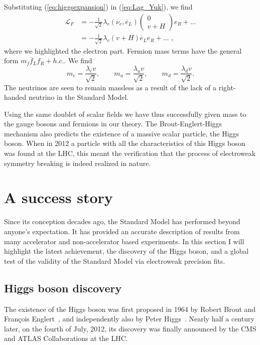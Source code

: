 Substituting (\ref{eq:higgsexpansion}) in (\ref{eq:Lag_Yuk}), we find 
\begin{align}
  \mathcal{L}_F &= - \frac{1}{\sqrt{2}} \lambda_e (\overline{\nu}_e, \overline{e}_L) 
		  \begin{pmatrix}0 \\ v+H \end{pmatrix} e_R + ... \\
                &= - \frac{1}{\sqrt{2}} \lambda_e (v+H) \overline{e}_L e_R + ... \textrm{ ,}
  \label{eq:yukawa}
\end{align}
where we highlighted the electron part. 
Fermion mass terms have the general form $m_f \overline{f}_L f_R + h.c.$. We find
\begin{equation}
m_e = \frac{\lambda_e v}{\sqrt{2}}, \qquad m_u = \frac{\lambda_u v}{\sqrt{2}}, \qquad m_d =
\frac{\lambda_d v}{\sqrt{2}}. \label{eq:fermion_masses}
\end{equation}
The neutrinos are seen to remain massless as a result of the lack of a right-handed neutrino in the
Standard Model. 

Using the same doublet of scalar fields we have thus successfully given mass to the gauge bosons and
fermions in our theory. The Brout-Englert-Higgs mechanism also predicts the existence of a massive
scalar particle, the Higgs boson. 
When in 2012 a particle with all the characteristics of this Higgs boson was found at the LHC, this
meant the verification that the process of electroweak symmetry breaking is indeed realized in
nature. 


\section{A success story \label{sec:SM_success}}

Since its conception decades ago, the Standard Model has performed beyond anyone's expectation. 
It has provided an accurate description of results from many accelerator and non-accelerator based
experiments. In this section I will highlight the latest achievement, the discovery of the Higgs
boson, and a global test of the validity of the Standard Model via electroweak precision fits. 

\subsection{Higgs boson discovery}

The existence of the Higgs boson was first proposed in 1964 by Robert Brout and Fran\c{c}ois
Englert~\cite{Englert:1964et}, and independently also by Peter Higgs~\cite{Higgs:1964pj}. Nearly
half a century later, on the fourth of July, 2012, its discovery was finally announced by the CMS
and ATLAS Collaborations at the LHC.

